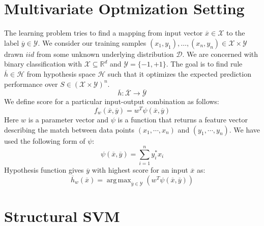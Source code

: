 \documentclass{article} %
\DeclareMathOperator*{\argmax}{arg\,max}
\begin{document}
\section{Multivariate Optmization Setting}
The learning problem tries to find a mapping from input vector $\overline{x} \in \mathcal{X}$ to the label $\overline{y} \in \mathcal{Y}$. We consider our training samples $(x_1,y_1),\ldots,(x_n,y_n) \in \mathcal{X} \times \mathcal{Y}$ drawn $\textit{iid}$ from some unknown underlying distribution $\mathcal{D}$. We are concerned with binary classification with $\mathcal{X} \subseteq \mathbb{R}^d$ and $\mathcal{Y}=\{-1,+1\}$. The goal is to find rule $\overline{h} \in \mathcal{H}$ from hypothesis space $\mathcal{H}$ such that it optimizes the expected prediction performance over $S \in (\mathcal{X} \times \mathcal{Y})^n$. 
\begin{equation*}
\overline{h}:\overline{\mathcal{X}} \rightarrow \overline{\mathcal{Y}}
\end{equation*}
We define score for a particular input-output combination as follows:
\begin{equation*}
f_w(\overline{x},\overline{y}) = w^T\psi({\overline{x},\overline{y}})
\end{equation*}
Here $w$ is a parameter vector and $\psi$ is a function that returns a feature vector describing the match between data points $(x_1, \cdots, x_n)$ and $(y_1, \cdots, y_n)$. We have used the following form of $\psi$:
\begin{equation*}
\psi(\overline{x},\overline{y}) = \sum_{i=1}^n y_i^*x_i
\end{equation*}
Hypothesis function gives $\overline{y}$ with highest score for an input $\overline{x}$ as:
\begin{equation*}
\overline{h}_w(\overline{x})=\argmax_{\overline{y}\in\mathcal{Y}}(w^T\psi({\overline{x},\overline{y}}))
\end{equation*}

\section{Structural SVM}
\end{document}
